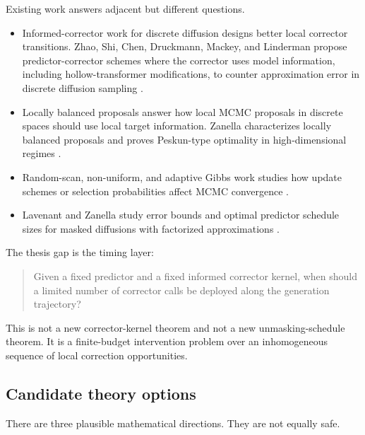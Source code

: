 \documentclass[11pt]{article}
\newcommand{\1}{\mathbf 1}
\begin{document}
Existing work answers adjacent but different questions.

\begin{itemize}[leftmargin=1.5em]
\item Informed-corrector work for discrete diffusion designs better local
corrector transitions.  Zhao, Shi, Chen, Druckmann, Mackey, and Linderman
propose predictor-corrector schemes where the corrector uses model information,
including hollow-transformer modifications, to counter approximation error in
discrete diffusion sampling \cite{zhao2024informed}.
\item Locally balanced proposals answer how local MCMC proposals in discrete
spaces should use local target information.  Zanella characterizes locally
balanced proposals and proves Peskun-type optimality in high-dimensional
regimes \cite{zanella2020informed}.
\item Random-scan, non-uniform, and adaptive Gibbs work studies how update
schemes or selection probabilities affect MCMC convergence
\cite{roberts1997updating,chimisov2018adapting}.
\item Lavenant and Zanella study error bounds and optimal predictor schedule
sizes for masked diffusions with factorized approximations \cite{lavenant2025}.
\end{itemize}

The thesis gap is the timing layer:

\begin{quote}
Given a fixed predictor and a fixed informed corrector kernel, when should a
limited number of corrector calls be deployed along the generation trajectory?
\end{quote}

This is not a new corrector-kernel theorem and not a new unmasking-schedule
theorem.  It is a finite-budget intervention problem over an inhomogeneous
sequence of local correction opportunities.

\subsection{Candidate theory options}

There are three plausible mathematical directions.  They are not equally safe.
\end{document}
